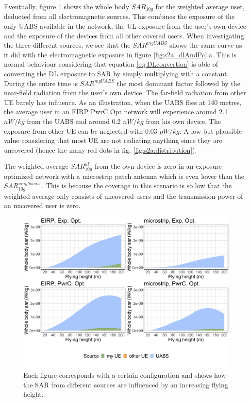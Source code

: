Eventually, figure \ref{fig:s2shfourSourcesMatrix} shows the whole body $SAR_{10g}$ for the weighted average user, deducted from all electromagnetic sources. 
This combines the exposure 
of the only \gls{UABS} available in the network, 
the \gls{UL} exposure from the user’s own device and the exposure of the devices from all other covered users. 
When investigating the three different sources, we see 
that the $SAR^{myUABS}$ shows the same curve as it did with the electromagnetic exposure 
in figure \ref{fig:s2a_dlAndPc}.a. This is normal behaviour considering that equation \ref{eq:DLconvertion} is able of 
converting the \gls{DL} exposure to \gls{SAR} by simply multiplying with a constant.
During the entire time is $SAR^{myUABS}$ the most dominant factor followed by 
 the near-field radiation from the user's own device.
The far-field radiation from other \gls{UE} barely has influence. 
As an illustration, when the \gls{UABS} flies at 140 metres, the average user in an \gls{EIRP} \gls{PwrC Opt} network will 
experience around  2.1 $nW/kg$ from the \gls{UABS} and around 0.2 $nW/kg$ from his own device.
The exposure from other \gls{UE} can be neglected with 0.03 $pW/kg$. A low but plausible value considering that most 
\gls{UE} are not radiating anything since they are uncovered (hence the many red dots in fig. \ref{fig:s2a:distribution}).

The weighted average $SAR^{ul}_{10g}$ from the own device is zero in an exposure optimized network with a microstrip patch antenna 
which is even lower than the $SAR^{neighbours}_{10g}$.
This is because the coverage in this scenario is so low that the weighted average 
only consists of uncovered users and the transmission power of an uncovered user is zero.

\begin{figure}[h!]
  \includegraphics[width=\textwidth]{../results/s2/fhFourSources.png}
  \caption{Each figure corresponds with a certain configuration and shows how the \acs{SAR} from 
  different sources are influenced by an increasing flying height.}
  \label{fig:s2shfourSourcesMatrix}
\end{figure}

